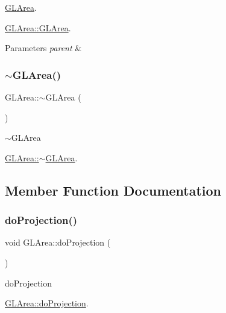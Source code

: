 \hyperlink{classGLArea}{G\+L\+Area}. 

\hyperlink{classGLArea_a999988e18caf705bcd41acb09a8dcc8e}{G\+L\+Area\+::\+G\+L\+Area}.


\begin{DoxyParams}{Parameters}
{\em parent} & \\
\hline
\end{DoxyParams}
\mbox{\label{classGLArea_afa9c60f160f51d8ff4af29e602792722}} 
\subsubsection{\texorpdfstring{$\sim$\+G\+L\+Area()}{~GLArea()}}
{\footnotesize\ttfamily G\+L\+Area\+::$\sim$\+G\+L\+Area (\begin{DoxyParamCaption}{ }\end{DoxyParamCaption})\hspace{0.3cm}{\ttfamily [override]}}



$\sim$\+G\+L\+Area 

\hyperlink{classGLArea_afa9c60f160f51d8ff4af29e602792722}{G\+L\+Area\+::$\sim$\+G\+L\+Area}. 

\subsection{Member Function Documentation}
\mbox{\label{classGLArea_a7258b85eec87415b8bdfde5a20b9bf34}} 
\subsubsection{\texorpdfstring{do\+Projection()}{doProjection()}}
{\footnotesize\ttfamily void G\+L\+Area\+::do\+Projection (\begin{DoxyParamCaption}{ }\end{DoxyParamCaption})\hspace{0.3cm}{\ttfamily [protected]}}



do\+Projection 

\hyperlink{classGLArea_a7258b85eec87415b8bdfde5a20b9bf34}{G\+L\+Area\+::do\+Projection}. \mbox{\label{classGLArea_a561f724c4f5a676c7d48dc4c1facab6a}} 
